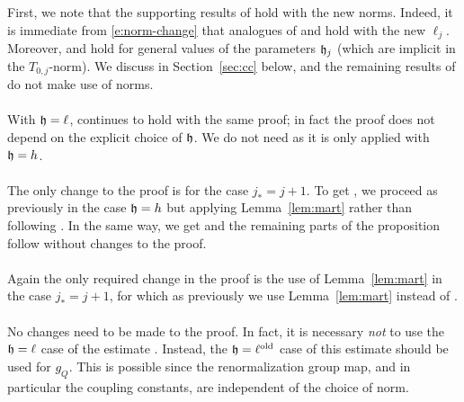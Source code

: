 First, we note that the supporting results of \cite[Section~\ref{IE-sec:W}]{BS-rg-IE} hold with the new norms.
Indeed,
it is immediate from \eqref{e:norm-change} that analogues of
\cite[Proposition~\ref{IE-prop:Wnorms}]{BS-rg-IE} and
\cite[Lemmas~\ref{IE-lem:epdV}, \ref{IE-lem:W-logwish}--\ref{IE-lem:Wbil}]{BS-rg-IE} hold with the new $\ell_j$.
Moreover, \cite[Lemma~\ref{IE-lem:Fpibd-bis}]{BS-rg-IE} and \cite[Proposition~\ref{IE-prop:Wbounds}]{BS-rg-IE} hold
for general values of the parameters $\mathfrak{h}_j$ (which are implicit in the $T_{0,j}$-norm).
We discuss \cite[Proposition~\ref{IE-prop:1-LTdefXY}]{BS-rg-IE}
in Section~\ref{sec:cc} below,
and the remaining results of \cite[Section~\ref{IE-sec:W}]{BS-rg-IE} do not make use of norms.

\paragraph{\cite[Proposition~\ref{IE-prop:Iupper}]{BS-rg-IE}}
With $\mathfrak{h} = \ell$, \cite[\eqref{IE-e:Iupper-a}]{BS-rg-IE} continues to hold with the same proof;
in fact the proof does not depend on the explicit choice of $\mathfrak{h}$.
We do not need \cite[\eqref{IE-e:Iupper-b}]{BS-rg-IE} as it is only applied with $\mathfrak{h} = h$.

\paragraph{\cite[Proposition~\ref{IE-prop:Istab}]{BS-rg-IE}}
The only change to the proof is for the case $j_* = j + 1$.
To get \cite[\eqref{IE-e:IF}]{BS-rg-IE},
we proceed as previously in the case $\mathfrak{h}=h$ but applying Lemma~\ref{lem:mart}
rather than \cite[Lemma~\ref{IE-lem:mart}]{BS-rg-IE} following \cite[(5.22)]{BS-rg-IE}.
In the same way, we get \cite[\eqref{IE-e:Iass}]{BS-rg-IE} and the remaining parts of
the proposition follow without changes to the proof.

\paragraph{\cite[Proposition~\ref{IE-prop:Ianalytic1:5}]{BS-rg-IE}}
Again the only required change in the proof is the use of
Lemma~\ref{lem:mart} in the case $j_* = j + 1$,
for which as previously we use Lemma~\ref{lem:mart} instead of \cite[Lemma~\ref{IE-lem:mart}]{BS-rg-IE}.

\paragraph{\cite[Proposition~\ref{IE-prop:JCK-app-1}]{BS-rg-IE}}
No changes need to be made to the proof.
In fact, it is necessary \emph{not} to use the $\mathfrak{h} = \ell$ case
of the estimate \cite[(5.32)]{BS-rg-IE}. Instead, the
$\mathfrak{h} = \ell^{\mathrm{old}}$ case of this estimate should be used for $g_Q$.
This is possible since the renormalization
group map, and in particular the coupling constants, are independent of the choice of norm.

